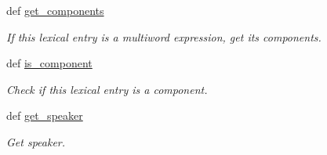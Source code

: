 \begin{DoxyCompactItemize}
def \hyperlink{classlmf_1_1src_1_1core_1_1lexical__entry_1_1_lexical_entry_a5ac31dac631e9825425bdfa550311555}{get\+\_\+components}
\begin{DoxyCompactList}\small\item\em If this lexical entry is a multiword expression, get its components. \end{DoxyCompactList}\item 
def \hyperlink{classlmf_1_1src_1_1core_1_1lexical__entry_1_1_lexical_entry_a8c0e7904dbb8c7b25560db7601b3ad71}{is\+\_\+component}
\begin{DoxyCompactList}\small\item\em Check if this lexical entry is a component. \end{DoxyCompactList}\item 
def \hyperlink{classlmf_1_1src_1_1core_1_1lexical__entry_1_1_lexical_entry_ac741ce07b961fb9d6d0a1033cf1f1790}{get\+\_\+speaker}
\begin{DoxyCompactList}\small\item\em Get speaker. \end{DoxyCompactList}\end{DoxyCompactItemize}
